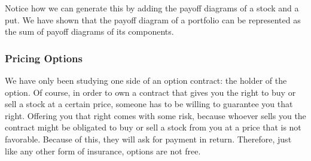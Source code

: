 \documentclass[letterpaper,10pt,english]{jupyterBook}
\begin{document}
\sphinxAtStartPar
{}

\sphinxAtStartPar
Notice how we can generate this by adding the payoff diagrams of a stock and a put. We have shown that the payoff diagram of a portfolio can be represented as the sum of payoff diagrams of its components.

\sphinxAtStartPar
{}


\subsubsection{Pricing Options}
\label{\detokenize{content/10-finance/options:pricing-options}}
\sphinxAtStartPar
We have only been studying one side of an option contract: the holder of the option. Of course, in order to own a contract that gives you the right to buy or sell a stock at a certain price, someone has to be willing to guarantee you that right. Offering you that right comes with some risk, because whoever sells you the contract might be obligated to buy or sell a stock from you at a price that is not favorable. Because of this, they will ask for payment in return. Therefore, just like any other form of insurance, options are not free.
\end{document}
